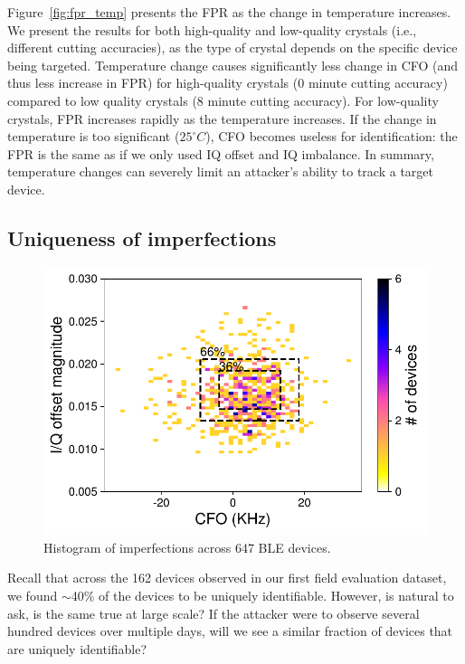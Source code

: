 Figure~\ref{fig:fpr_temp} presents the FPR as the change in temperature increases. We
present the results for both high-quality and low-quality crystals (i.e.,
different cutting accuracies), as the type of crystal depends on the specific
device being targeted. Temperature change causes significantly less change in
CFO (and thus less increase in FPR) for high-quality crystals (0 minute cutting
accuracy) compared to low quality crystals (8 minute cutting accuracy). For
low-quality crystals, FPR increases rapidly as the temperature increases.  If
the change in temperature is too significant ($25^\circ C$), CFO 
becomes useless for identification: the FPR is the same as if we only used IQ offset
and IQ imbalance. In summary, temperature changes can severely limit an attacker's ability to track a target device.


\subsection{Uniqueness of imperfections}

\begin{figure}
    \centering
    \includegraphics[width = \linewidth]{bletracking/plots/heatmap_hallway.pdf} 
    \caption{Histogram of imperfections across 647 BLE devices.}
    \label{fig:heatmap_hallway}
\end{figure}

Recall that across the 162 devices observed in our first field evaluation dataset,
we found $\sim$40\% of the devices to be uniquely identifiable. %
However, is natural to ask, is the same 
true at large scale? If the attacker were to observe several hundred devices
over multiple days, will we see a similar fraction of devices that are
uniquely identifiable?

